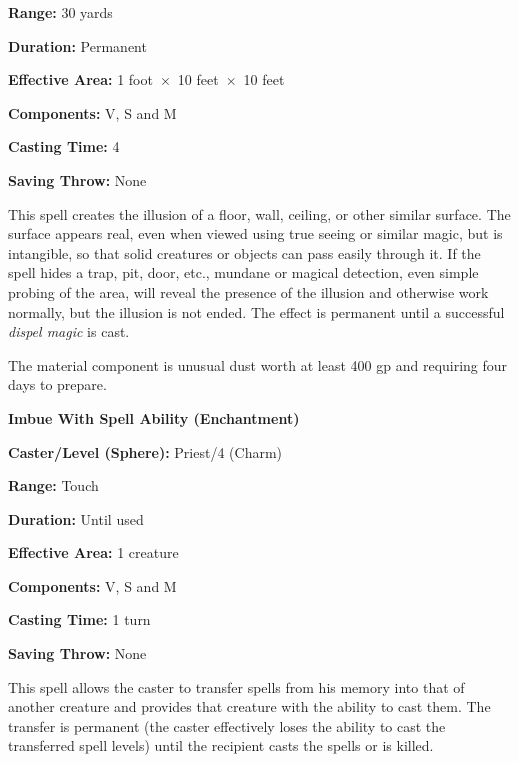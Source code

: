 \begin{multicols}{2}
\begin{minipage}{\columnwidth}
\noindent \textbf{Range:} 30 yards

\noindent \textbf{Duration:} Permanent

\noindent \textbf{Effective Area:} 1 foot~$\times$~10 feet~$\times$~10 feet

\noindent \textbf{Components:} V, S and M

\noindent \textbf{Casting Time:} 4

\noindent \textbf{Saving Throw:} None

\end{minipage}

This spell creates the illusion of a floor, wall, ceiling, or other similar surface.  The surface appears real, even when viewed using true seeing or similar magic, but is intangible, so that solid creatures or objects can pass easily through it.  If the spell hides a trap, pit, door, etc., mundane or magical detection, even simple probing of the area, will reveal the presence of the illusion and otherwise work normally, but the illusion is not ended.  The effect is permanent until a successful \textit{dispel magic} is cast.

The material component is unusual dust worth at least 400 gp and requiring four days to prepare.

\vspace{1em}

\noindent
\begin{minipage}{\columnwidth}

\noindent \textbf{Imbue With Spell Ability (Enchantment)}

\noindent \textbf{Caster/Level (Sphere):} Priest/4 (Charm)

\noindent \textbf{Range:} Touch

\noindent \textbf{Duration:} Until used

\noindent \textbf{Effective Area:} 1 creature

\noindent \textbf{Components:} V, S and M

\noindent \textbf{Casting Time:} 1 turn

\noindent \textbf{Saving Throw:} None

\end{minipage}

This spell allows the caster to transfer spells from his memory into that of another creature and provides that creature with the ability to cast them.  The transfer is permanent (the caster effectively loses the ability to cast the transferred spell levels) until the recipient casts the spells or is killed.


\end{multicols}
